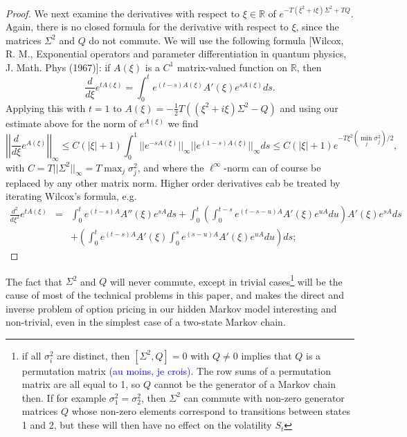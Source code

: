 \documentclass[a4paper, 11pt]{amsart}
\newtheorem{definition and theorem}[theorem]{Definition and   
Theorem}
\begin{document}
\begin{proof}
    We next examine the derivatives with respect to $\xi \in \mathbb{R } $ of $e^{- T (\xi ^2 + i \xi ) \Sigma ^2 + T Q } . $ Again, there is no closed formula for the derivative with respect to $\xi $, since the matrices $\Sigma ^2 $ and $Q $ do not commute. We will use the following formula [Wilcox, R. M., Exponential operators and parameter differentiation in quantum physics, J. Math. Phys  (1967)]: if $A(\xi ) $ is a $C^1 $ matrix-valued function on $\mathbb{R } $, then
    $$
        \frac{d }{d \xi } e^{t A (\xi ) } = \int _0 ^t e^{(t - s ) A(\xi ) } A'(\xi ) e^{s A (\xi ) } ds .
    $$
    Applying this with $t = 1 $ to $A(\xi ) = - \frac{1 }{2 } T ((\xi ^2 + i \xi ) \Sigma ^2 - Q ) $ and using our estimate above for the norm of $e^{A(\xi ) } $ we find
    $$
        \left | \left | \frac{d }{d \xi } e^{A (\xi ) } \right | \right | _{\infty } \leq C (|\xi | + 1 ) \int _0 ^1 || e^{- s A (\xi ) } ||_{\infty } || e^{(1 - s ) A(\xi ) } ||_{\infty } ds \leq C (|\xi | + 1 ) e^{- T \xi ^2 (\min _j \sigma _j ^2 ) / 2 } ,
    $$
    with $C = T || \Sigma ^2 ||_{\infty } = T \max _j \sigma _j ^2 $, and where the $\ell ^{\infty } $-norm can of course be replaced by any other matrix norm. Higher order derivatives cab be treated by iterating Wilcox's formula, e.g.
    \begin{eqnarray*}
        \frac{d^2 }{d \xi ^2 } e^{t A (\xi ) } &=& \int _0 ^t e^{(t - s ) A } A''(\xi ) e^{s A } ds + \int _0 ^t \left( \int _0 ^{t - s } e^{(t - s - u ) A } A'(\xi ) e^{u  A } du \right) A'(\xi ) e^{s A } ds \\
        &\ & + \left( \int _0 ^t e^{(t - s ) A } A'(\xi ) \int _0 ^s e^{(s - u ) A } A'(\xi ) e^{u A } du \right) ds ;
    \end{eqnarray*}


\end{proof}

The fact that $\Sigma ^2 $ and $Q $ will never commute, except in trivial cases\footnote{if all $\sigma _i ^2 $ are distinct, then $[ \Sigma ^2 , Q ] = 0 $ with $Q \neq 0 $ implies that $Q $ is a permutation matrix \textcolor{blue}{(au moins, je crois)}. The row sums of a permutation matrix are all equal to 1, so $Q $ cannot be the generator of a Markov chain then.  If for example $\sigma _1 ^2 = \sigma _2 ^2 $, then $\Sigma ^2 $ can commute with non-zero generator matrices $Q $ whose non-zero elements correspond to transitions between states 1 and 2, but these will then have no effect on the volatility $S_t $} will be the cause of most of the technical problems in this paper, and makes the direct and inverse problem of option pricing in our hidden Markov model interesting and non-trivial, even in the simplest case of a two-state Markov chain.
\medskip
\end{document}
